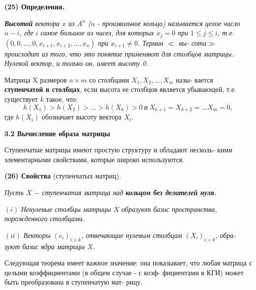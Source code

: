 	\noindent
	{\bf (25) Определения.}
	
	{\it {\bf Высотой} вектора $x$ из $A^{n}$ ($n$ - произвольное кольцо) называется\linebreak
	целое число $n - i$, где $i$ самое большое из чисел, для которых $x_{j} = 0$ при\linebreak
	$1 \leqslant j \leqslant i$, т.е. $(0, 0, \ldots, 0, x_{i + 1}, x_{i + 2}, \ldots, x_{n})$ при $x_{i + 1} \neq 0$. Термин {\it $\ll$ вы-\linebreak
	сота$\gg$} происходит из того, что это понятие применяют для столбцов\linebreak
	матрицы. Нулевой вектор, и только он, имеет высоту 0.
	
	Матрица X размеров $n \times m$ со столбцами $X_{1}, X_{2}, \ldots, X_{m}$ назы-\linebreak
	вается {\bf ступенчатой в столбцах}, если высота ее столбцов является\linebreak
	убывающей, т.е. существует $k$ такое, что:
	$$h(X_{1}) > h(X_{2}) > \ldots > h(X_{k}) > 0 \ \text{и} \ X_{k + 1} = X_{k + 2} = \ldots X_{m} = 0,$$
	где $h(X_{i})$ обозначает высоту вектора $X_{i}$.}
	
	\noindent
	{\large {\bf 3.2 Вычисление образа матрицы}}
	
	\noindent
	Ступенчатые матрицы имеют простую структуру и обладают несколь-\linebreak
	кими элементарными свойствами, которые широко используются.
	
	\noindent
	{\bf (26) Свойства} (ступенчатых матриц).
	
	{\it Пусть $X$ $-$ ступенчатая матрица над {\bf кольцом без делителей\linebreak
	нуля.}}

	$(i)$ {\it Ненулевые столбцы матрицы $X$ образуют базис пространства,\linebreak
	порожденного столбцами.}

	$(ii)$ {\it Векторы $(e_{i})_{i > k}$, отвечающие нулевым столбцам $(X_{i})_{i > k}$, обра-\linebreak
	зуют базис ядра матрицы $X$.}
	
	Следующая теорема имеет важное значение: она показывает, что\linebreak
	любая матрица с целыми коэффициентами (в общем случае - с коэф-\linebreak
	фициентами в КГИ) может быть преобразована в ступенчатую мат-\linebreak
	рицу.
	
